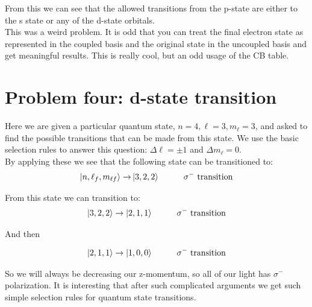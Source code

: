 \documentclass[10pt]{article} %
\begin{document}
From this we can see that the allowed transitions from the p-state are either to the s state
or any of the d-state orbitals.\\

This was a weird problem. It is odd that you can treat the final electron state as
represented in the coupled basis and the original state in the uncoupled basis and get
meaningful results. This is really cool, but an odd usage of the CB table.\\

\section{Problem four: d-state transition}
Here we are given a particular quantum state, $n=4,\ell=3,m_\ell=3$, and asked to find
the possible transitions that can be made from this state. We use the basic selection
rules to answer this question: $\Delta \ell = \pm 1$ and $\Delta m_\ell = 0$.\\

By applying these we see that the following state can be transitioned to:\\

\begin{align*}
  \ket{n, \ell_f,m_{\ell f}} \rightarrow
  &\ket{3, 2, 2}\hspace{1cm}\sigma^-\mbox{ transition}\\
\end{align*}

From this state we can transition to:\\

\begin{align*}
  \ket{3, 2, 2}\rightarrow
  \ket{2, 1, 1}\hspace{1cm}\sigma^-\mbox{ transition}\\
\end{align*}

And then

\begin{align*}
  \ket{2, 1, 1}\rightarrow
  \ket{1, 0, 0}\hspace{1cm}\sigma^-\mbox{ transition}\\
\end{align*}

So we will always be decreasing our z-momentum, so all of our light has $\sigma^-$
polarization. It is interesting that after such complicated arguments we get such
simple selection rules for quantum state transitions.\\
\end{document}
